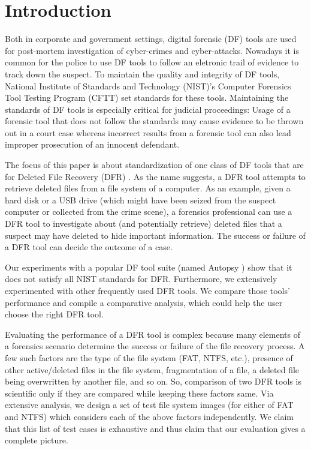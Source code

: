 
\section{Introduction}

Both in corporate and government settings, digital forensic (DF) tools are used for post-mortem investigation of cyber-crimes and cyber-attacks. 
Nowadays it is common \cite{df:news} for the police to use DF tools to follow an eletronic trail of evidence to track down the suspect. 
To maintain the quality and integrity of DF tools, National Institute of Standards and Technology (NIST)'s 
Computer Forensics Tool Testing Program (CFTT) \cite{cftt:nist} 
set standards for these tools. Maintaining the standards of DF tools 
is especially critical for judicial proceedings: Usage of a forensic tool that does not follow the standards may cause evidence to be thrown 
out in a court case whereas incorrect results from a forensic tool can also lead improper prosecution of an innocent defendant. 

The focus of this paper is about standardization of one class of DF 
tools that are for Deleted File Recovery (DFR) \cite{meta:dfr:standards}. 
As the name suggests, a DFR tool attempts to retrieve deleted files
from a file system of a computer. As an example, given a hard disk or a USB drive 
(which might have been seized from the suspect computer or collected from the crime scene), a 
forensics professional can use a DFR tool to investigate about (and potentially retrieve) deleted files that 
a suspect may have deleted to hide important information. 
The success or failure of a DFR tool can decide the outcome of a case.  

Our experiments with a popular DF tool suite (named Autopsy \cite{autopsy}) 
show that it does not satisfy all NIST standards for DFR. 
Furthermore, we extensively experimented with other frequently used DFR tools. 
We compare those tools' performance and compile a comparative analysis, which could help the user choose the right DFR tool. 

Evaluating the performance of a DFR tool is complex because many elements of a forensics scenario determine 
the success or failure of the file recovery process. 
A few such factors are the type of the file system (FAT, NTFS, etc.), presence of other active/deleted 
files in the file system, fragmentation of a file, a deleted file being overwritten by another file, and so on.
So, comparison of two DFR tools is scientific only if they are compared while keeping these factors same. 
Via extensive analysis, we design a set of test file system images (for either of FAT and NTFS) which considers each of the above factors independently. 
We claim that this list of test cases is exhaustive and thus claim that our evaluation gives a complete picture. 

